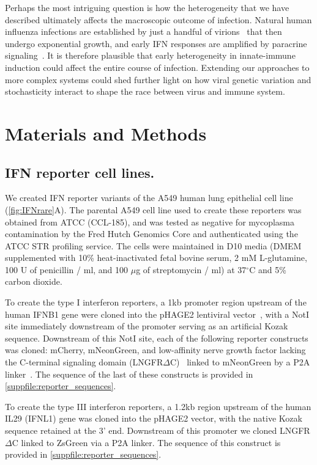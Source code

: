 \documentclass[lineno]{asm-article}
\newcommand{\FIG}[1]{\autoref{fig:#1}}
\newcommand{\SUPPFILE}[1]{\autoref{suppfile:#1}}
\begin{document}
Perhaps the most intriguing question is how the heterogeneity that we have described ultimately affects the macroscopic outcome of infection.
Natural human influenza infections are established by just a handful of virions~\cite{mccrone2018stochastic, xue2018reconciling, varble2014influenza} that then undergo exponential growth, and early IFN responses are amplified by paracrine signaling~\cite{stetson2006type,honda2006type}.
It is therefore plausible that early heterogeneity in innate-immune induction could affect the entire course of infection.
Extending our approaches to more complex systems could shed further light on how viral genetic variation and stochasticity interact to shape the race between virus and immune system.


\section{Materials and Methods}
\small
\subsection{IFN reporter cell lines.}
We created IFN reporter variants of the A549 human lung epithelial cell line (\FIG{IFNrare}A).
The parental A549 cell line used to create these reporters was obtained from ATCC (CCL-185), and was tested as negative for mycoplasma contamination by the Fred Hutch Genomics Core and authenticated using the ATCC STR profiling service.
The cells were maintained in D10 media (DMEM supplemented with 10\% heat-inactivated fetal bovine serum, 2 mM L-glutamine, 100 U of penicillin / ml, and 100 $\mu$g of streptomycin / ml) at 37$^{\circ}$C and 5\% carbon dioxide.

To create the type I interferon reporters, a 1kb promoter region upstream of the human IFNB1 gene were cloned into the pHAGE2 lentiviral vector~\cite{oconnell2010lentiviral}, with a NotI site immediately downstream of the promoter serving as an artificial Kozak sequence. 
Downstream of this NotI site, each of the following reporter constructs was cloned: mCherry, mNeonGreen, and low-affinity nerve growth factor lacking the C-terminal signaling domain (LNGFR$\Delta$C)~\cite{bonini1997hsv,ruggieri1997cell} linked to mNeonGreen by a P2A linker~\cite{kim2011high}.
The sequence of the last of these constructs is provided in \SUPPFILE{reporter_sequences}.

To create the type III interferon reporters, a 1.2kb region upstream of the human IL29 (IFNL1) gene was cloned into the pHAGE2 vector, with the native Kozak sequence retained at the 3' end. 
Downstream of this promoter we cloned LNGFR$\Delta$C linked to ZsGreen via a P2A linker.
The sequence of this construct is provided in \SUPPFILE{reporter_sequences}.
 
\end{document}
